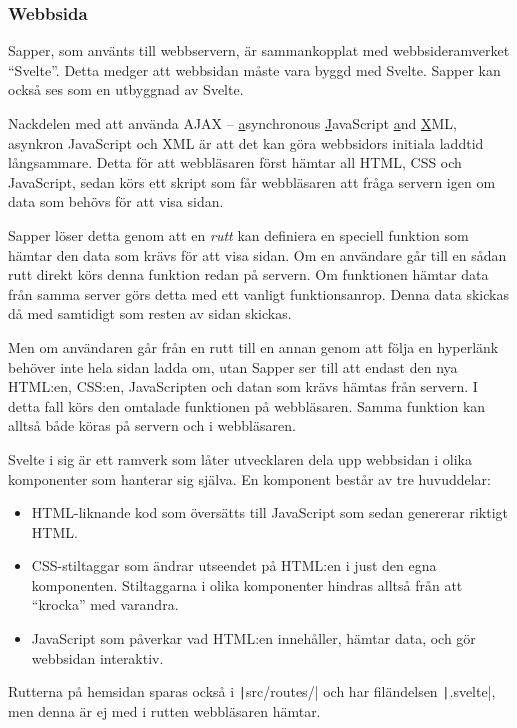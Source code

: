 \documentclass{article}
\begin{document}
\subsubsection{Webbsida}

Sapper, som använts till webbservern, är sammankopplat med webbsideramverket
``Svelte''. Detta medger att webbsidan måste vara byggd med Svelte. Sapper kan
också ses som en utbyggnad av Svelte.

Nackdelen med att använda AJAX \--- \underline{a}synchronous
\underline{J}avaScript \underline{a}nd \underline{X}ML, asynkron JavaScript och
XML är att det kan göra webbsidors initiala laddtid långsammare. Detta för att
webbläsaren först hämtar all HTML, CSS och JavaScript, sedan körs ett skript som
får webbläsaren att fråga servern igen om data som behövs för att visa sidan.

Sapper löser detta genom att en \textit{rutt} kan definiera en speciell funktion
som hämtar den data som krävs för att visa sidan. Om en användare går till en
sådan rutt direkt körs denna funktion redan på servern. Om funktionen hämtar
data från samma server görs detta med ett vanligt funktionsanrop. Denna data
skickas då med samtidigt som resten av sidan skickas.

Men om användaren går från en rutt till en annan genom att följa en hyperlänk
behöver inte hela sidan ladda om, utan Sapper ser till att endast den nya
HTML:en, CSS:en, JavaScripten och datan som krävs hämtas från servern. I detta
fall körs den omtalade funktionen på webbläsaren. Samma funktion kan alltså både
köras på servern och i webbläsaren.

Svelte i sig är ett ramverk som låter utvecklaren dela upp webbsidan i olika
komponenter som hanterar sig själva. En komponent består av tre huvuddelar:

\begin{itemize}
	\item HTML-liknande kod som översätts till JavaScript som sedan genererar
		riktigt HTML.
	\item CSS-stiltaggar som ändrar utseendet på HTML:en i just den egna
		komponenten. Stiltaggarna i olika komponenter hindras alltså från att
		``krocka'' med varandra.
	\item JavaScript som påverkar vad HTML:en innehåller, hämtar data, och gör
		webbsidan interaktiv.
\end{itemize}

Rutterna på hemsidan sparas också i \texttt|src/routes/|
och har filändelsen \texttt|.svelte|, men denna är ej
med i rutten webbläsaren hämtar.
\end{document}
